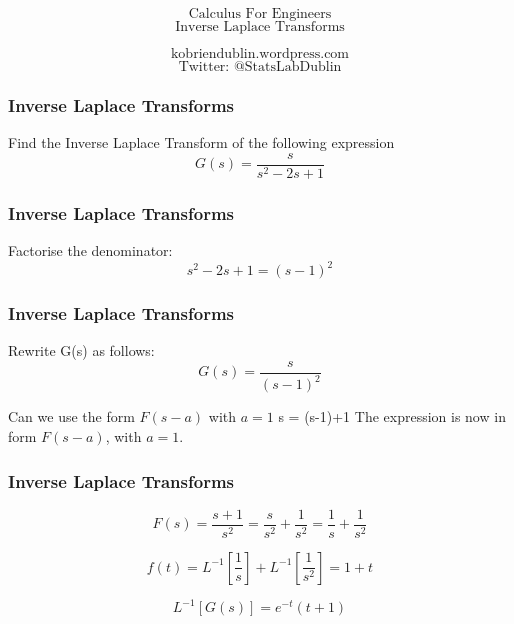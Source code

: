 \documentclass{beamer}
\begin{document}
\begin{frame}
\Huge
\[\mbox{Calculus For Engineers}\]
\LARGE
\[\mbox{Inverse Laplace Transforms}\]

\Large
\[\mbox{kobriendublin.wordpress.com}\]
\[\mbox{Twitter: @StatsLabDublin}\]
\end{frame}


\begin{frame}
\frametitle{Inverse Laplace Transforms}
\LARGE
\vspace{-2cm}
Find the Inverse Laplace Transform of the following expression
\[ G(s) = \frac{s}{s^2 -2s + 1} \]
\end{frame}
\begin{frame} 
\frametitle{Inverse Laplace Transforms}

Factorise the denominator: \[s ^2 - 2s + 1 = (s - 1)^2\]
\end{frame}
\begin{frame} 
\frametitle{Inverse Laplace Transforms}
Rewrite G(s) as follows: \[G(s) = \frac{s}{(s-1)^2} \]

Can we use the form $F(s-a)$ with $a=1$
s = (s-1)+1
The expression is now in form $F(s-a)$, with $a = 1$.
\end{frame}
\begin{frame} 
\frametitle{Inverse Laplace Transforms}
\[ F(s) = \frac{s+1}{s^2} = \frac{s}{s^2} + \frac{1}{s^2} = \frac{1}{s} + \frac{1}{s^2}\]

\[ f(t) = L^{-1}[\frac{1}{s}] + L^{-1}[\frac{1}{s^2}] = 1 + t\]

\[ L^{-1}[G(s)] = e^{-t}(t+1 ) \]

\end{frame}
\end{document}
